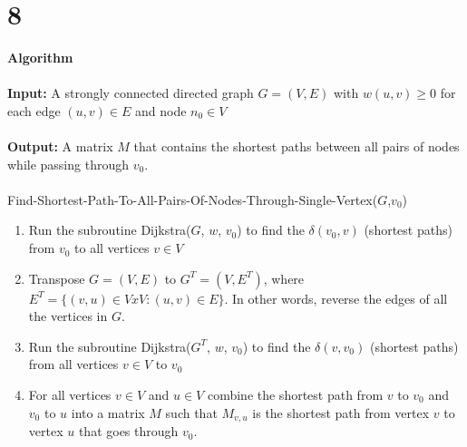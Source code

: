 \documentclass[12pt]{article}
\begin{document}
\section*{8}
{\selectfont
\textbf{Algorithm}\\
\\
\textbf{Input:} A strongly connected directed graph $G=(V,E)$ with $w(u,v) \ge 0$ for each edge $(u,v) \in E$ and node $n_0 \in V$\\
\\
\textbf{Output:} A matrix $M$ that contains the shortest paths between all pairs of nodes while passing through $v_0$.\\
\\
Find-Shortest-Path-To-All-Pairs-Of-Nodes-Through-Single-Vertex($G$,$v_0$)
\begin{enumerate}
\item Run the subroutine Dijkstra($G$, $w$, $v_0$) to find the $\delta{(v_0,v)}$ (shortest paths) from $v_0$ to all vertices $v \in V$\\
\item Transpose $G=(V,E)$ to $G^T = (V,E^T)$, where $E^T = \{(v,u) \in VxV:(u,v)\in E \}$.  In other words, reverse the edges of all the vertices in $G$.
\item Run the subroutine Dijkstra($G^T$, $w$, $v_0$) to find the $\delta{(v, v_0)}$ (shortest paths) from all vertices $v \in V$ to $v_0$\\
\item For all vertices $v \in V$ and $u \in V$ combine the shortest path from $v$ to $v_0$ and $v_0$ to $u$ into a matrix $M$ such that $M_{v,u}$ is the shortest path from vertex $v$ to vertex $u$ that goes through $v_0$.\\ 
\end{enumerate}
}
\end{document}

